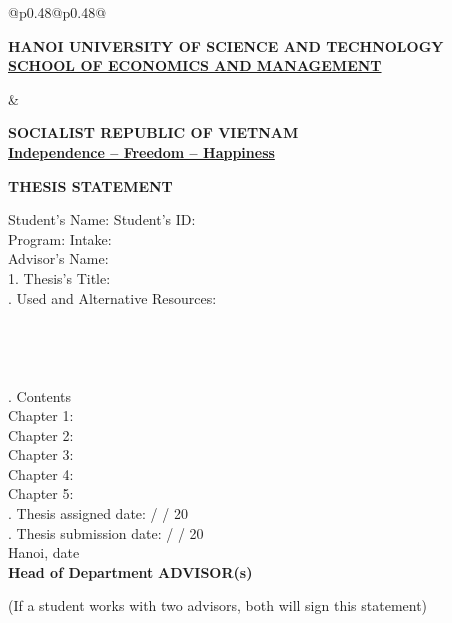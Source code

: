 \thispagestyle{empty}
\begin{center}
    \begin{tabular}{@{}p{0.48\textwidth}@{\hspace{0.04\textwidth}}p{0.48\textwidth}@{}}
        \begin{minipage}[t]{\linewidth}
            \centering
            {\fontsize{10pt}{15.6pt}\selectfont\textbf{HANOI UNIVERSITY OF SCIENCE AND TECHNOLOGY}} \\[0.2em]
            {\fontsize{10pt}{15.6pt}\underline{\textbf{SCHOOL OF ECONOMICS AND MANAGEMENT}}}
        \end{minipage}
        &
        \begin{minipage}[t]{\linewidth}
            \centering
            {\fontsize{10pt}{15.6pt}\selectfont\textbf{SOCIALIST REPUBLIC OF VIETNAM}} \\[0.2em]
            {\fontsize{10pt}{15.6pt}\underline{\textbf{Independence -- Freedom -- Happiness}}}
        \end{minipage}
    \end{tabular}
\end{center}

\begin{center}
\textbf{\LARGE THESIS STATEMENT}
\end{center}

\noindent Student's Name: \dotfill \hspace{1cm} Student's ID: \dotfill \\
Program: \dotfill \hspace{1cm} Intake: \dotfill \\
Advisor's Name: \dotfill \\
1. Thesis's Title: \dotfill \\
. Used and Alternative Resources: \dotfill \\
\makebox[\textwidth]{\dotfill} \\
\makebox[\textwidth]{\dotfill} \\
\makebox[\textwidth]{\dotfill} \\
\makebox[\textwidth]{\dotfill} \\
. Contents \\
Chapter 1: \dotfill \\
Chapter 2: \dotfill \\
Chapter 3: \dotfill \\
Chapter 4: \dotfill \\
Chapter 5: \dotfill \\
. Thesis assigned date: \dotfill / \dotfill / 20\dotfill \\
. Thesis submission date: \dotfill / \dotfill / 20\dotfill \\
\hspace{0.5\textwidth}Hanoi, date\dotfill\\
\noindent\textbf{Head of Department} \hfill \textbf{ADVISOR(s)}

\vspace{3cm}
\noindent\footnotesize{(If a student works with two advisors, both will sign this statement)} 